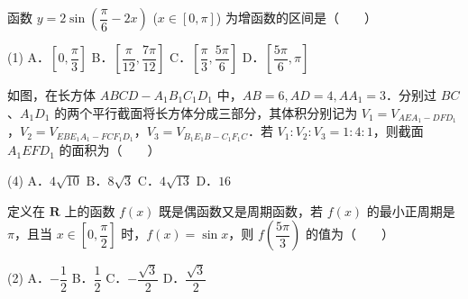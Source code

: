 \begin{question}
函数 $y = 2\sin\left(\dfrac{\pi}{6} - 2x\right)$ ($x \in [0, \pi]$) 为增函数的区间是\mbox{（　　）}

\begin{gkopts}(1)
\task A．$\left[0, \dfrac{\pi}{3}\right]$
\task B．$\left[\dfrac{\pi}{12}, \dfrac{7\pi}{12}\right]$
\task C．$\left[\dfrac{\pi}{3}, \dfrac{5\pi}{6}\right]$
\task D．$\left[\dfrac{5\pi}{6}, \pi\right]$
\end{gkopts}

\Needspace{0.4\textheight}
\end{question}
\begin{question}
如图，在长方体 $ABCD - A_1B_1C_1D_1$ 中，$AB = 6, AD = 4, AA_1 = 3$．分别过 $BC$、$A_1D_1$ 的两个平行截面将长方体分成三部分，其体积分别记为 $V_1 = V_{AEA_1-DFD_1}$，$V_2 = V_{EBE_1A_1-FCF_1D_1}$，$V_3 = V_{B_1E_1B-C_1F_1C}$．若 $V_1 : V_2 : V_3 = 1 : 4 : 1$，则截面 $A_1EFD_1$ 的面积为\mbox{（　　）}
\nopagebreak[4]
\begin{center}\end{center}
\nopagebreak[4]
\begin{gkopts}(4)
\task A．$4\sqrt{10}$
\task B．$8\sqrt{3}$
\task C．$4\sqrt{13}$
\task D．$16$
\end{gkopts}

\end{question}
\begin{question}
定义在 $\mathbf{R}$ 上的函数 $f(x)$ 既是偶函数又是周期函数，若 $f(x)$ 的最小正周期是 $\pi$，且当 $x \in \left[0, \dfrac{\pi}{2}\right]$ 时，$f(x) = \sin x$，则 $f\left(\dfrac{5\pi}{3}\right)$ 的值为\mbox{（　　）}

\begin{gkopts}(2)
\task A．$-\dfrac{1}{2}$
\task B．$\dfrac{1}{2}$
\task C．$-\dfrac{\sqrt{3}}{2}$
\task D．$\dfrac{\sqrt{3}}{2}$
\end{gkopts}

\end{question}

